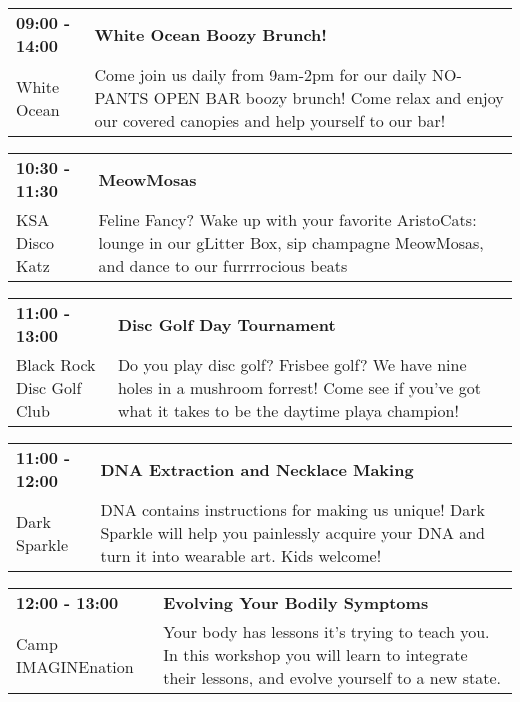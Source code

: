 \begin{tabular}{ p{1in} p{2.2in} }
    \textbf{09:00 - 14:00} & \textbf{White Ocean Boozy Brunch!} \\
    White Ocean \newline  & Come join us daily from 9am-2pm for our daily NO-PANTS OPEN BAR boozy brunch! Come relax and enjoy our covered canopies and help yourself to our bar! \\
    \hline 
\end{tabular}
    
\begin{tabular}{ p{1in} p{2.2in} }
    \textbf{10:30 - 11:30} & \textbf{MeowMosas} \\
    KSA Disco Katz \newline  & Feline Fancy? Wake up with your favorite AristoCats: lounge in our gLitter Box, sip champagne MeowMosas, and dance to our furrrrocious beats \\
    \hline 
\end{tabular}
    
\begin{tabular}{ p{1in} p{2.2in} }
    \textbf{11:00 - 13:00} & \textbf{Disc Golf Day Tournament} \\
    Black Rock Disc Golf Club \newline  & Do you play disc golf? Frisbee golf? We have nine holes in a mushroom forrest! Come see if you've got what it takes to be the daytime playa champion! \\
    \hline 
\end{tabular}
    
\begin{tabular}{ p{1in} p{2.2in} }
    \textbf{11:00 - 12:00} & \textbf{DNA Extraction and Necklace Making} \\
    Dark Sparkle \newline  & DNA contains instructions for making us unique! Dark Sparkle will help you painlessly acquire your DNA and turn it into wearable art. Kids welcome! \\
    \hline 
\end{tabular}
    
\begin{tabular}{ p{1in} p{2.2in} }
    \textbf{12:00 - 13:00} & \textbf{Evolving Your Bodily Symptoms} \\
    Camp IMAGINEnation \newline  & Your body has lessons it's trying to teach you.  In this workshop you will learn to integrate their lessons, and evolve yourself to a new state. \\
    \hline 
\end{tabular}
    
